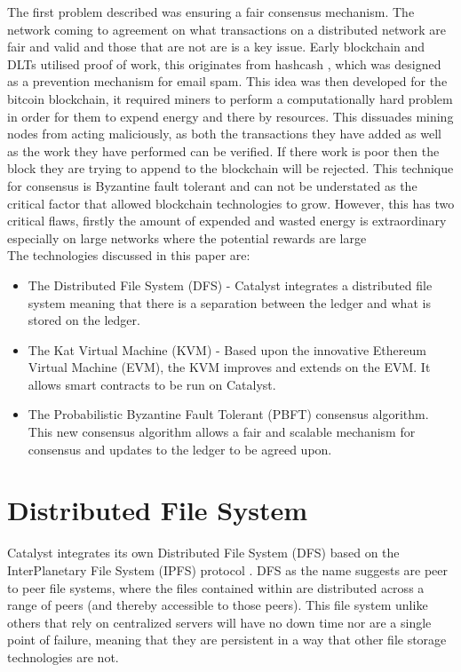 \documentclass{article}
\begin{document}
The first problem described was ensuring a fair consensus mechanism. The network coming to agreement on what transactions on a distributed network are fair and valid and those that are not are is a key issue. Early blockchain and DLTs utilised proof of work, this originates from hashcash \cite{back2002hashcash}, which was designed as a prevention mechanism for email spam. This idea was then developed for the bitcoin blockchain, it required miners to perform a computationally hard problem in order for them to expend energy and there by resources. This dissuades mining nodes from acting maliciously, as both the transactions they have added as well as the work they have performed can be verified. If there work is poor then the block they are trying to append to the blockchain will be rejected. This technique for consensus is Byzantine fault tolerant and can not be understated as the critical factor that allowed blockchain technologies to grow. However, this has two critical flaws, firstly the amount of expended and wasted energy is extraordinary especially on large networks where the potential rewards are large \\




The technologies discussed in this paper are:

\begin{itemize}
\item The Distributed File System (DFS) - Catalyst integrates a distributed file system meaning that there is a separation between the ledger and what is stored on the ledger. 
\item The Kat Virtual Machine (KVM) - Based upon the innovative Ethereum Virtual Machine (EVM), the KVM improves and extends on the EVM. It allows smart contracts to be run on Catalyst. 
\item The Probabilistic Byzantine Fault Tolerant (PBFT) consensus algorithm. This new consensus algorithm allows a fair and scalable mechanism for consensus and updates to the ledger to be agreed upon.  
\end{itemize}



\section{Distributed File System}

Catalyst integrates its own Distributed File System (DFS) \cite{DFS} based on the InterPlanetary File System (IPFS) protocol \cite{benet2014ipfs}. DFS as the name suggests are peer to peer file systems, where the files contained within are distributed across a range of peers (and thereby accessible to those peers). This file system unlike others that rely on centralized servers will have no down time nor are a single point of failure, meaning that they are persistent in a way that other file storage technologies are not. \\
\end{document}
